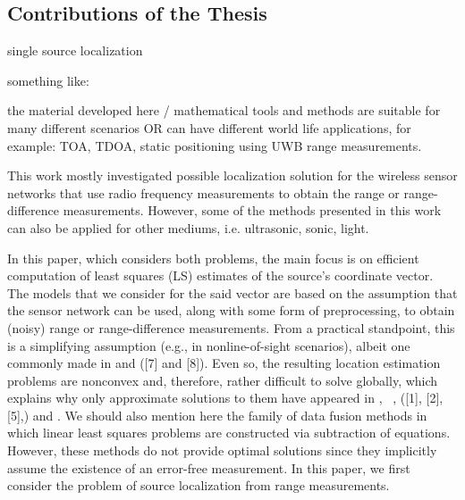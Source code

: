 \subsection{Contributions  of the Thesis} \label{contributions}


single source localization

something like:

the material developed here / mathematical tools and methods are suitable for many different scenarios 
OR
can have different world life applications, for example: TOA, TDOA, static positioning using UWB range measurements. 

This work mostly investigated possible localization solution for the wireless sensor networks that use radio frequency measurements to obtain the range or range-difference measurements. However, some of the methods presented in this work can also be applied for other mediums, i.e. ultrasonic, sonic, light. 

In this paper, which considers both problems, the main focus is on efficient computation of least squares (LS) estimates of the source’s coordinate vector. The models that we consider for the said vector are based on  the assumption that the sensor network can be used, along with some form of preprocessing, to obtain (noisy) range or range-difference measurements. From a practical standpoint, this is a simplifying assumption (e.g., in nonline-of-sight scenarios), albeit one commonly made in \cite{Cheung} and \cite{classMDS} ([7] and [8]). Even so, the resulting location estimation problems are nonconvex and, therefore, rather difficult to solve globally, which explains why only approximate solutions to them have appeared in \cite{SmithAbel}, ~, \cite{LiHu} ([1], [2], [5],) and \cite{Cheung}. We should also mention here the family of data fusion methods \cite{Sayed} in which linear least squares problems are constructed via subtraction of equations. However, these methods do not provide optimal solutions since they implicitly assume the existence of an error-free measurement. In this paper, we first consider the problem of source localization from range measurements. 


